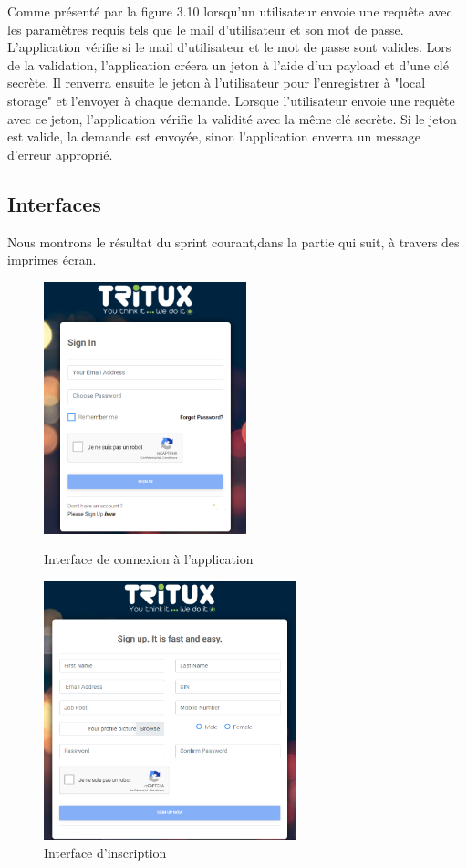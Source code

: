 \begin{itemize}
Comme présenté par la figure 3.10 lorsqu'un utilisateur envoie une requête avec les paramètres requis tels que le mail d'utilisateur et
son mot de passe. L'application vérifie si le mail d'utilisateur et le mot de passe sont valides. Lors de
la validation, l'application créera un jeton à l'aide d'un payload et d'une clé secrète. Il renverra
ensuite le jeton à l'utilisateur pour l'enregistrer à "local storage" et l'envoyer à chaque demande. Lorsque l'utilisateur
envoie une requête avec ce jeton, l'application vérifie la validité avec la même clé secrète. Si le
jeton est valide, la demande est envoyée, sinon l'application enverra un message d'erreur approprié.



\end{itemize}
\subsection{Interfaces}
Nous montrons le résultat du sprint courant,dans la partie qui suit, à travers des imprimes écran.
\begin{figure}[!htb]
	\includegraphics[width=\linewidth, height=7.3cm]{login.PNG}
	\caption{Interface de connexion à l'application }\label{fig:Interface de connexion à l'application }
	\endminipage\hfill
	\includegraphics[width=\linewidth,height=7.5cm]{inscription.PNG}
	\caption{Interface d'inscription}\label{fig:Interface d'inscription }
	\endminipage\hfill
\end{figure}


